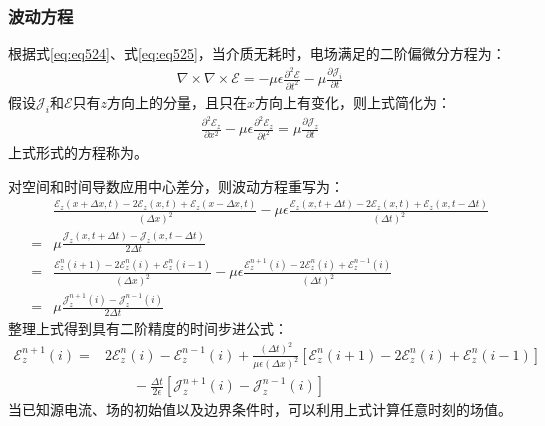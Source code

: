 \documentclass{article}
\numberwithin{equation}{section}
\renewcommand{\vec}[1]{\boldsymbol{#1}}
\begin{document}
\subsubsection{波动方程}
根据式\ref{eq:eq524}、式\ref{eq:eq525}，当介质无耗时，电场满足的二阶偏微分方程为：
\begin{align}
    \label{eq:eq534}
    \nabla \times \nabla \times \vec{\mathcal{E}}=-\mu\epsilon\frac{\partial^2 \vec{\mathcal{E}}}{\partial t^2}-\mu\frac{\partial\vec{\mathcal{J}}_{i}}{\partial t}
\end{align}
假设$\vec{\mathcal{J}}_{i}$和$\vec{\mathcal{E}}$只有$z$方向上的分量，且只在$x$方向上有变化，则上式简化为：
\begin{align}
    \label{eq:eq535}
    \frac{\partial^2 \mathcal{E}_z}{\partial x^2}-\mu\epsilon\frac{\partial^2 \mathcal{E}_z}{\partial t^2}=\mu\frac{\partial\mathcal{J}_{z}}{\partial t}
\end{align}
上式形式的方程称为\textbf{\color{blue}{波动方程}}。\par
对空间和时间导数应用中心差分，则波动方程重写为：
\begin{align}
    \label{eq:eq536}
     &\frac{\mathcal{E}_z(x+\Delta x,t)-2\mathcal{E}_z(x,t)+\mathcal{E}_z(x-\Delta x,t)}{(\Delta x)^2}-\mu\epsilon\frac{\mathcal{E}_z(x,t+\Delta t)-2\mathcal{E}_z(x,t)+\mathcal{E}_z(x,t-\Delta t)}{(\Delta t)^2} \nonumber \\
    =&\mu\frac{\mathcal{J}_z(x,t+\Delta t)-\mathcal{J}_z(x,t-\Delta t)}{2\Delta t} \nonumber \\
    =&\frac{\mathcal{E}_z^n(i+1)-2\mathcal{E}_z^n(i)+\mathcal{E}_z^n(i-1)}{(\Delta x)^2}-\mu\epsilon\frac{\mathcal{E}_z^{n+1}(i)-2\mathcal{E}_z^n(i)+\mathcal{E}_z^{n-1}(i)}{(\Delta t)^2} \nonumber \\
    =&\mu\frac{\mathcal{J}_z^{n+1}(i)-\mathcal{J}_z^{n-1}(i)}{2\Delta t}
\end{align}
整理上式得到具有二阶精度的时间步进公式：
\begin{align}
    \label{eq:eq537}
    \mathcal{E}_z^{n+1}(i)=&2\mathcal{E}_z^{n}(i)-\mathcal{E}_z^{n-1}(i)+\frac{(\Delta t)^2}{\mu\epsilon(\Delta x)^2}\left[\mathcal{E}_z^n(i+1)-2\mathcal{E}_z^n(i)+\mathcal{E}_z^n(i-1)\right] \nonumber \\
                           &\qquad-\frac{\Delta t}{2\epsilon}\left[\mathcal{J}_z^{n+1}(i)-\mathcal{J}_z^{n-1}(i)\right]
\end{align}
当已知源电流、场的初始值以及边界条件时，可以利用上式计算任意时刻的场值。
\end{document}
